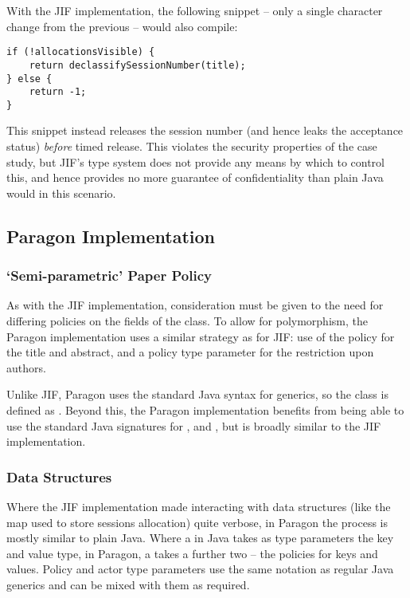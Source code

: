 With the JIF implementation, the following snippet -- only a single character change from the previous -- would also compile:

\begin{verbatim}
if (!allocationsVisible) {
	return declassifySessionNumber(title);
} else {
	return -1;
}
\end{verbatim}

This snippet instead releases the session number (and hence leaks the acceptance status) \textit{before} timed release. This violates the security properties of the case study, but JIF's type system does not provide any means by which to control this, and hence provides no more guarantee of confidentiality than plain Java would in this scenario.

\subsection{Paragon Implementation}

\subsubsection{`Semi-parametric' Paper Policy}

As with the JIF implementation, consideration must be given to the need for differing policies on the fields of the  class. To allow for polymorphism, the Paragon implementation uses a similar strategy as for JIF: use of the  policy for the title and abstract, and a policy type parameter for the restriction upon authors.

Unlike JIF, Paragon uses the standard Java syntax for generics, so the class is defined as . Beyond this, the Paragon implementation benefits from being able to use the standard Java signatures for ,  and , but is broadly similar to the JIF implementation.

\subsubsection{Data Structures}

Where the JIF implementation made interacting with data structures (like the map used to store sessions allocation) quite verbose, in Paragon the process is mostly similar to plain Java. Where a  in Java takes as type parameters the key and value type, in Paragon, a  takes a further two -- the policies for keys and values. Policy and actor type parameters use the same notation as regular Java generics and can be mixed with them as required.

